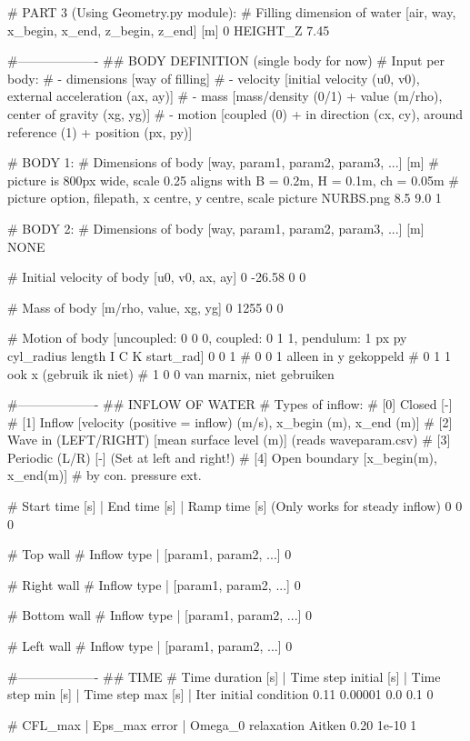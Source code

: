 # PART 3 (Using Geometry.py module):
# Filling dimension of water [air, way, x_begin, x_end, z_begin, z_end] [m]
0 HEIGHT_Z 7.45

#-------------------
## BODY DEFINITION (single body for now)
# Input per body:
# - dimensions      [way of filling]
# - velocity        [initial velocity (u0, v0), external acceleration (ax, ay)]
# - mass            [mass/density (0/1) + value (m/rho), center of gravity (xg, yg)]
# - motion          [coupled (0) + in direction (cx, cy), around reference (1) + position (px, py)]

# BODY 1:
# Dimensions of body [way, param1, param2, param3, ...] [m]
# picture is 800px wide, scale 0.25 aligns with B = 0.2m, H = 0.1m, ch = 0.05m
# picture option, filepath, x centre, y centre, scale
picture NURBS.png 8.5 9.0 1

# BODY 2:
# Dimensions of body [way, param1, param2, param3, ...] [m]
NONE

# Initial velocity of body [u0, v0, ax, ay]
0 -26.58 0 0

# Mass of body [m/rho, value, xg, yg]
0 1255 0 0

# Motion of body [uncoupled: 0 0 0, coupled: 0 1 1, pendulum: 1 px py cyl_radius length I C K start_rad]
0 0 1
# 0 0 1 alleen in y gekoppeld
# 0 1 1 ook x (gebruik ik niet)
# 1 0 0 van marnix, niet gebruiken

#-------------------
## INFLOW OF WATER
# Types of inflow:
# [0] Closed                [-]
# [1] Inflow                [velocity (positive = inflow) (m/s), x_begin (m), x_end (m)]
# [2] Wave in (LEFT/RIGHT)  [mean surface level (m)] (reads waveparam.csv)
# [3] Periodic (L/R)        [-] (Set at left and right!)
# [4] Open boundary         [x_begin(m), x_end(m)]
#     by con. pressure ext.

# Start time [s] | End time [s] | Ramp time [s] (Only works for steady inflow)
0 0 0

# Top wall
# Inflow type | [param1, param2, ...]
0

# Right wall
# Inflow type | [param1, param2, ...]
0

# Bottom wall
# Inflow type | [param1, param2, ...]
0

# Left wall
# Inflow type | [param1, param2, ...]
0

#-------------------
## TIME
# Time duration [s]	| Time step initial [s]		| Time step min [s]	| Time step max [s] | Iter initial condition
0.11 0.00001 0.0 0.1 0

# CFL_max | Eps_max error | Omega_0 relaxation Aitken
0.20		1e-10	        1

